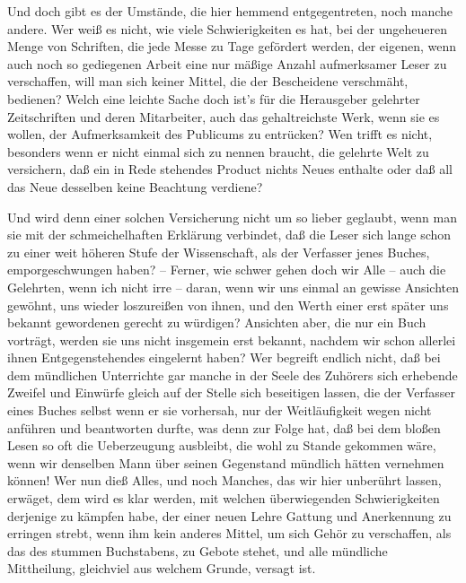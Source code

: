 Und doch gibt es der Umstände, die hier hemmend entgegentreten, noch manche andere. Wer weiß es nicht, wie viele Schwierigkeiten es hat, bei der ungeheueren Menge von Schriften, die jede Messe zu Tage gefördert werden, der eigenen, wenn auch noch so gediegenen Arbeit eine nur mäßige Anzahl aufmerksamer Leser zu verschaffen, will man sich keiner Mittel, die der Bescheidene verschmäht, bedienen? Welch eine leichte Sache doch ist's für die Herausgeber gelehrter Zeitschriften und deren Mitarbeiter, auch das gehaltreichste Werk, wenn sie es wollen, der Aufmerksamkeit des Publicums zu entrücken? Wen trifft es nicht, besonders wenn er nicht einmal sich zu nennen braucht, die gelehrte Welt zu versichern, daß ein in Rede stehendes Product nichts Neues enthalte oder daß all das Neue desselben keine Beachtung verdiene?\par
Und wird denn einer solchen Versicherung nicht um so lieber geglaubt, wenn man sie mit der schmeichelhaften Erklärung verbindet, daß die Leser sich lange schon zu einer weit höheren Stufe der Wissenschaft, als der Verfasser jenes Buches, emporgeschwungen haben? -- Ferner, wie schwer gehen doch wir  Alle -- auch die Gelehrten, wenn ich nicht irre -- daran, wenn wir uns einmal an gewisse Ansichten gewöhnt, uns wieder loszureißen von ihnen, und den Werth einer erst später uns bekannt gewordenen gerecht zu würdigen? Ansichten aber, die nur ein Buch vorträgt, werden sie uns nicht insgemein erst bekannt, nachdem wir schon allerlei ihnen Entgegenstehendes eingelernt haben? Wer begreift endlich nicht, daß bei dem mündlichen Unterrichte gar manche in der Seele des Zuhörers sich erhebende Zweifel und Einwürfe gleich auf der Stelle sich beseitigen lassen, die der Verfasser eines Buches selbst wenn er sie vorhersah, nur der Weitläufigkeit wegen nicht anführen und beantworten durfte, was denn zur Folge hat, daß bei dem bloßen Lesen so oft die Ueberzeugung ausbleibt, die wohl zu Stande gekommen wäre, wenn wir denselben Mann über seinen Gegenstand mündlich hätten vernehmen können! Wer nun dieß Alles, und noch Manches, das wir hier unberührt lassen, erwäget, dem wird es klar werden, mit welchen überwiegenden Schwierigkeiten derjenige zu kämpfen habe, der einer neuen Lehre Gattung und Anerkennung zu erringen strebt, wenn ihm kein anderes Mittel, um sich Gehör zu verschaffen, als das des stummen Buchstabens, zu Gebote stehet, und alle mündliche Mittheilung, gleichviel aus welchem Grunde, versagt 
ist.\par

